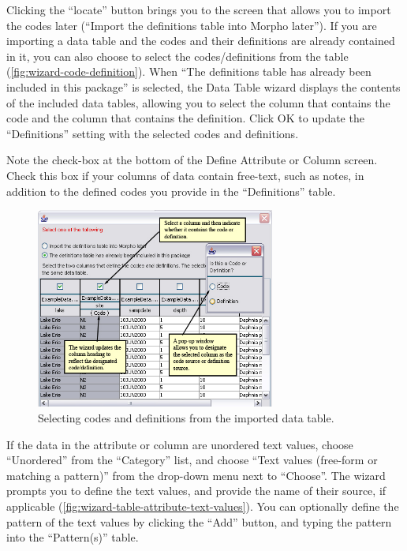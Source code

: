 Clicking the ``locate'' button brings you to the screen that allows you
to import the codes later (``Import the definitions table into Morpho
later''). If you are importing a data table and the codes and their
definitions are already contained in it, you can also choose to select
the codes/definitions from the table
(\autoref{fig:wizard-code-definition}). When ``The definitions table has
already been included in this package'' is selected, the Data Table
wizard displays the contents of the included data tables, allowing you
to select the column that contains the code and the column that contains
the definition. Click OK to update the ``Definitions'' setting with the
selected codes and definitions.

Note the check-box at the bottom of the Define Attribute or Column
screen. Check this box if your columns of data contain free-text, such
as notes, in addition to the defined codes you provide in the
``Definitions'' table. 

\begin{figure}
  \centering
    \includegraphics[width=0.7\textwidth]{images/wizard-code-definition.jpg}
  \caption{Selecting codes and definitions from the imported data
    table.}
  \label{fig:wizard-code-definition}
\end{figure}

If the data in the attribute or column are unordered text values, choose
``Unordered'' from the ``Category'' list, and choose ``Text values
(free-form or matching a pattern)'' from the drop-down menu next to
``Choose''. The wizard prompts you to define the text values, and
provide the name of their source, if applicable
(\autoref{fig:wizard-table-attribute-text-values}). You can optionally
define the pattern of the text values by clicking the ``Add'' button,
and typing the pattern into the ``Pattern(s)'' table. 

